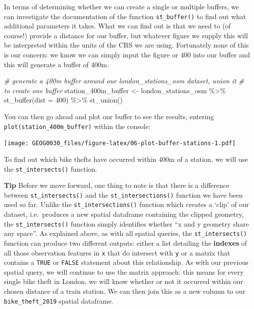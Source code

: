 \documentclass[
]{book}
\newenvironment{Shaded}{\begin{snugshade}}{\end{snugshade}}
\newcommand{\AttributeTok}[1]{\textcolor[rgb]{0.77,0.63,0.00}{#1}}
\newcommand{\CommentTok}[1]{\textcolor[rgb]{0.56,0.35,0.01}{\textit{#1}}}
\newcommand{\DecValTok}[1]{\textcolor[rgb]{0.00,0.00,0.81}{#1}}
\newcommand{\FunctionTok}[1]{\textcolor[rgb]{0.00,0.00,0.00}{#1}}
\newcommand{\NormalTok}[1]{#1}
\newcommand{\OtherTok}[1]{\textcolor[rgb]{0.56,0.35,0.01}{#1}}
\newcommand{\SpecialCharTok}[1]{\textcolor[rgb]{0.00,0.00,0.00}{#1}}
\begin{document}
In terms of determining whether we can create a single or multiple buffers, we can investigate the documentation of the function \texttt{st\_buffer()} to find out what additional parameters it takes. What we can find out is that we need to (of course!) provide a distance for our buffer, but whatever figure we supply this will be interpreted within the units of the CRS we are using. Fortunately none of this is our concern: we know we can simply input the figure or 400 into our buffer and this will generate a buffer of 400m.

\begin{Shaded}
\begin{Highlighting}[]
\CommentTok{\# generate a 400m buffer around our london\_stations\_osm dataset, union it}
\CommentTok{\# to create one buffer}
\NormalTok{station\_400m\_buffer }\OtherTok{\textless{}{-}}\NormalTok{ london\_stations\_osm }\SpecialCharTok{\%\textgreater{}\%}
    \FunctionTok{st\_buffer}\NormalTok{(}\AttributeTok{dist =} \DecValTok{400}\NormalTok{) }\SpecialCharTok{\%\textgreater{}\%}
    \FunctionTok{st\_union}\NormalTok{()}
\end{Highlighting}
\end{Shaded}

You can then go ahead and plot our buffer to see the results, entering \texttt{plot(station\_400m\_buffer)} within the console:

\texttt{[image: GEOG0030\_files/figure-latex/06-plot-buffer-stations-1.pdf]}

To find out which bike thefts have occurred within 400m of a station, we will use the \texttt{st\_intersects()} function.

\textbf{Tip}
Before we move forward, one thing to note is that there is a difference between \texttt{st\_intersects()} and the \texttt{st\_intersections()} function we have been used so far. Unlike the \texttt{st\_intersections()} function which creates a `clip' of our dataset, i.e.~produces a new spatial dataframe containing the clipped geometry, the \texttt{st\_intersects()} function simply identifies whether ``x and y geometry share any space''. As explained above, as with all spatial queries, the \texttt{st\_intersects()} function can produce two different outputs: either a list detailing the \textbf{indexes} of all those observation features in \texttt{x} that do intersect with \texttt{y} or a matrix that contains a \texttt{TRUE} or \texttt{FALSE} statement about this relationship. As with our previous spatial query, we will continue to use the matrix approach: this means for every single bike theft in London, we will know whether or not it occurred within our chosen distance of a train station. We can then join this as a new column to our \texttt{bike\_theft\_2019} spatial dataframe.
\end{document}
